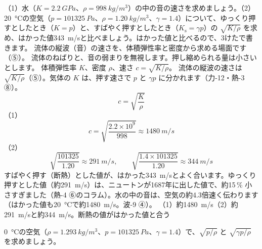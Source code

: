 \label{ph:波-5:ex9}
\begin{phreidai}[水と空気の音の速さ]
（1）水（$K=\qty{2.2}{GPa}$、$\rho=\qty{998}{kg/m^3}$）の中の音の速さを求めましょう。（2）\qty{20}{\celsius}の空気（$p=\qty{101325}{Pa}$、$\rho=\qty{1.20}{kg/m^3}$、$\gamma=1.4$）について、ゆっくり押すとしたとき（$K=p$）と、すばやく押すとしたとき（$K_{\mathrm s}=\gamma p$）の $\sqrt{K/\rho}$ を求め、はかった値\qty{343}{m/s}と比べましょう。はかった値と比べるので、3けたで書きます。
\phbamen
流体の縦波（音）の速さを、体積弾性率と密度から求める場面です（⑤）。
\phmushi
流体のねばりと、音の弱まりを無視します。押し縮められる量は小さいとします。
\phzu
体積弾性率 $K$、密度 $\rho$、速さ $c=\sqrt{K/\rho}$。
\phriyu
流体の縦波の速さは $\sqrt{K/\rho}$（⑤）。気体の $K$ は、押す速さで $p$ と $\gamma p$ に分かれます（力-12・熱-3 ⑧）。
\phtateru
\[c=\sqrt{\frac{K}{\rho}}\]
\phtoku
（1）\[c=\sqrt{\frac{2.2\times10^9}{998}}\approx\qty{1480}{m/s}\]
（2）\[\sqrt{\frac{\num{101325}}{1.20}}\approx\qty{291}{m/s},\qquad\sqrt{\frac{1.4\times\num{101325}}{1.20}}\approx\qty{344}{m/s}\]
\phtashikame
すばやく押す（断熱）とした値が、はかった\qty{343}{m/s}とよく合います。ゆっくり押すとした値（約\qty{291}{m/s}）は、ニュートンが1687年に出した値で、約15\,\% 小さすぎました（熱-4 ⑥のコラム）。水の中の音は、空気の約4.3倍速く伝わります（はかった値も\qty{20}{\celsius}で約\qty{1480}{m/s}。波-9 ④）。
\kotae （1）約\qty{1480}{m/s}（2）約\qty{291}{m/s}と約\qty{344}{m/s}。断熱の値がはかった値と合う
\end{phreidai}
\begin{jibun}
\qty{0}{\celsius}の空気（$\rho=\qty{1.293}{kg/m^3}$、$p=\qty{101325}{Pa}$、$\gamma=1.4$）で、$\sqrt{p/\rho}$ と $\sqrt{\gamma p/\rho}$ を求めましょう。
\end{jibun}

